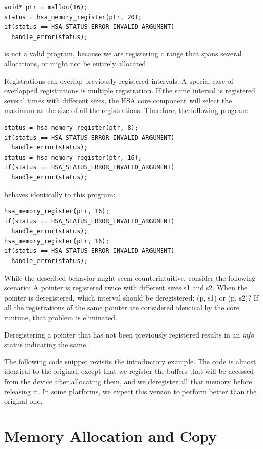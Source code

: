 \documentclass{book}
\begin{document}
\begin{lstlisting}
void* ptr = malloc(16);
status = hsa_memory_register(ptr, 20);
if(status == HSA_STATUS_ERROR_INVALID_ARGUMENT)
  handle_error(status);
\end{lstlisting}

is not a valid program, because we are registering a range that
spans several allocations, or might not be entirely allocated.

Registrations can overlap previously registered intervals. A special
case of overlapped registrations is multiple registration. If the
same interval is registered several times with different sizes, the
HSA core component will select the maximum as the size of all
the registrations. Therefore, the following program:

\begin{lstlisting}
status = hsa_memory_register(ptr, 8);
if(status == HSA_STATUS_ERROR_INVALID_ARGUMENT)
  handle_error(status);
status = hsa_memory_register(ptr, 16);
if(status == HSA_STATUS_ERROR_INVALID_ARGUMENT)
  handle_error(status);
\end{lstlisting}

behaves identically to this program:

\begin{lstlisting}
hsa_memory_register(ptr, 16);
if(status == HSA_STATUS_ERROR_INVALID_ARGUMENT)
  handle_error(status);
hsa_memory_register(ptr, 16);
if(status == HSA_STATUS_ERROR_INVALID_ARGUMENT)
  handle_error(status);
\end{lstlisting}

While the described behavior might seem counterintuitive, consider
the following scenario: A pointer is registered twice with
different sizes s1 and s2. When the pointer is deregistered, which
interval should be deregistered: (p, s1) or (p, s2)? If all the
registrations of the same pointer are considered identical by the
core runtime, that problem is eliminated.

Deregistering a pointer that has not been previously registered
results in an \emph{info} status indicating the same.

The following code snippet revisits the introductory example. The
code is almost identical to the original, except that we register
the buffers that will be accessed from the device after allocating
them, and we deregister all that memory before releasing it. In some
platforms, we expect this version to perform better than the
original one.


\hypertarget{coreapi_device_memory}{}\section{Memory Allocation
and Copy}\label{coreapi_device_memory}
\end{document}

